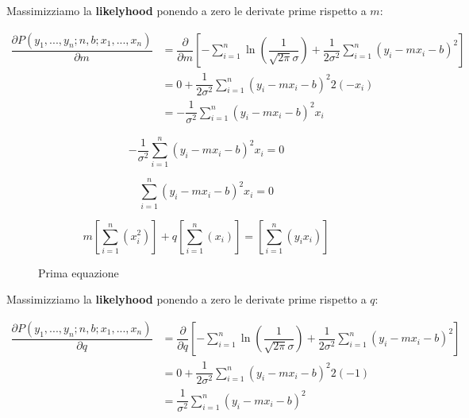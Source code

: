 \documentclass[\main/main.tex]{subfiles}
\begin{document}
Massimizziamo la \textbf{likelyhood} ponendo a zero le derivate prime rispetto a $m$:

\begin{align}
	\dfrac{\partial P \left(y_1,...,y_n; n, b; x_1, ..., x_n \right)}{\partial m} & = \dfrac{\partial}{\partial m} \left [ - \sum_{i=1}^n \ln
		\left ( \dfrac{1}{\sqrt{2\pi}\sigma} \right )
		+ \dfrac{1}{2\sigma^2} \sum_{i=1}^n
		\left(y_i - mx_i - b \right)^2
		\right ]                                                                                                                                                        \\
	                                                                              & = 0 + \dfrac{1}{2\sigma^2} \sum_{i=1}^n \left(y_i - mx_i - b \right)^2 2 (-x_i) \\
	                                                                              & = -\dfrac{1}{\sigma^2} \sum_{i=1}^n \left(y_i - mx_i - b \right)^2  x_i
\end{align}

\[
	-\dfrac{1}{\sigma^2} \sum_{i=1}^n \left(y_i - mx_i - b \right)^2  x_i = 0
\]

\[
	\sum_{i=1}^n \left(y_i - mx_i - b \right)^2  x_i = 0
\]

\begin{figure}[H]
	\[
		m\left [ \sum_{i=1}^n \left(x_i^2 \right) \right ] + q \left [ \sum_{i=1}^n \left(x_i \right) \right ] = \left [ \sum_{i=1}^n \left(y_i x_i \right) \right ]
	\]
	\caption{Prima equazione}
\end{figure}

Massimizziamo la \textbf{likelyhood} ponendo a zero le derivate prime rispetto a $q$:

\begin{align}
	\dfrac{\partial P \left(y_1,...,y_n; n, b; x_1, ..., x_n \right)}{\partial q} & = \dfrac{\partial}{\partial q} \left [ - \sum_{i=1}^n \ln
		\left ( \dfrac{1}{\sqrt{2\pi}\sigma} \right )
		+ \dfrac{1}{2\sigma^2} \sum_{i=1}^n
		\left(y_i - mx_i - b \right)^2
		\right ]                                                                                                                                                      \\
	                                                                              & = 0 + \dfrac{1}{2\sigma^2} \sum_{i=1}^n \left(y_i - mx_i - b \right)^2 2 (-1) \\
	                                                                              & = \dfrac{1}{\sigma^2} \sum_{i=1}^n \left(y_i - mx_i - b \right)^2
\end{align}
\end{document}
